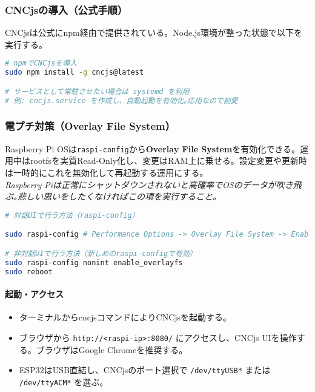 \documentclass[uplatex,dvipdfmx]{ujarticle}
\begin{document}
\subsubsection*{CNCjsの導入（公式手順）}
CNCjsは公式にnpm経由で提供されている。Node.js環境が整った状態で以下を実行する。

\begin{lstlisting}[caption=CNCjsのインストールと起動, label=code:cncjs-install, language=bash]
# npmでCNCjsを導入
sudo npm install -g cncjs@latest

# サービスとして常駐させたい場合は systemd を利用
# 例: cncjs.service を作成し、自動起動を有効化｡応用なので割愛
\end{lstlisting}
\subsubsection*{電プチ対策（Overlay File System）}
Raspberry Pi OSは\texttt{raspi-config}から\textbf{Overlay File System}を有効化できる。運用中はrootfsを実質Read-Only化し、変更はRAM上に乗せる。設定変更や更新時は一時的にこれを無効化して再起動する運用にする。\\
\emph{Raspberry Piは正常にシャットダウンされないと高確率でOSのデータが吹き飛ぶ｡悲しい思いをしたくなければこの項を実行すること｡}

\begin{lstlisting}[caption=OverlayFSの有効化（対話/非対話の例）, label=code:overlay, language=bash]
# 対話UIで行う方法（raspi-config）

sudo raspi-config # Performance Options -> Overlay File System -> Enable

# 非対話UIで行う方法（新しめのraspi-configで有効）
sudo raspi-config nonint enable_overlayfs
sudo reboot
\end{lstlisting}
\paragraph{起動・アクセス}
\begin{itemize}
\item ターミナルからcncjsコマンドによりCNCjsを起動する｡
\item ブラウザから \texttt{http://<raspi-ip>:8080/} にアクセスし、CNCjs UIを操作する。ブラウザはGoogle Chromeを推奨する。
\item ESP32はUSB直結し、CNCjsのポート選択で \texttt{/dev/ttyUSB*} または \texttt{/dev/ttyACM*} を選ぶ。
\end{itemize}
\end{document}
